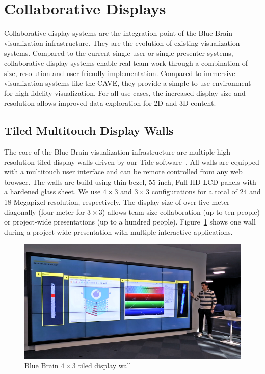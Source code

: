 \documentclass[10pt]{llncs}
\newcommand{\fig}[1]{Figure~\ref{#1}}
\begin{document}
\section{Collaborative Displays}

Collaborative display systems are the integration point of the Blue Brain
visualization infrastructure. They are the evolution of existing visualization
systems. Compared to the current single-user or single-presenter systems,
collaborative display systems enable real team work through a combination of
size, resolution and user friendly implementation. Compared to immersive
visualization systems like the CAVE, they provide a simple to use environment
for high-fidelity visualization. For all use cases, the increased display size
and resolution allows improved data exploration for 2D and 3D content.

\subsection{Tiled Multitouch Display Walls}

The core of the Blue Brain visualization infrastructure are multiple
high-resolution tiled display walls driven by our Tide software~\cite{tide}. All
walls are equipped with a multitouch user interface and can be remote controlled
from any web browser. The walls are build using thin-bezel, 55 inch, Full HD LCD
panels with a hardened glass sheet. We use $4\times 3$ and $3\times 3$
configurations for a total of 24 and 18 Megapixel resolution, respectively. The
display size of over five meter diagonally (four meter for $3\times 3$) allows
team-size collaboration (up to ten people) or project-wide presentations (up to
a hundred people). \fig{fTDW} shows one wall during a project-wide presentation
with multiple interactive applications.

\begin{figure}[h!t]
  \includegraphics[width=\columnwidth]{images/tdw}
  \caption{\label{fTDW}Blue Brain $4\times 3$ tiled display wall}
\end{figure}
\end{document}
